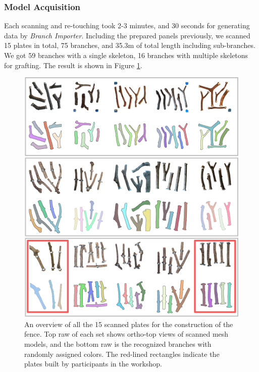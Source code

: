 \subsubsection*{Model Acquisition}
Each scanning and re-touching took 2-3 minutes, and 30 seconds for generating data by \textit{Branch Importer}.
Including the prepared panels previously, we scanned 15 plates in total, 75 branches, and 35.3m of total length including sub-branches.
We got 59 branches with a single skeleton, 16 branches with multiple skeletons for grafting.
The result is shown in Figure \ref{fig:scannedplates}.

\begin{figure}[ht]
  \begin{center}
    \includegraphics[width = 0.4\paperwidth]{images/fabrication/all_plates.png}
    \caption{An overview of all the 15 scanned plates for the construction of the fence. Top raw of each set shows ortho-top views of scanned mesh models, and the bottom raw is the recognized branches with randomly assigned colors. The red-lined rectangles indicate the plates built by participants in the workshop.}
    \label{fig:scannedplates}
  \end{center}
\end{figure}


